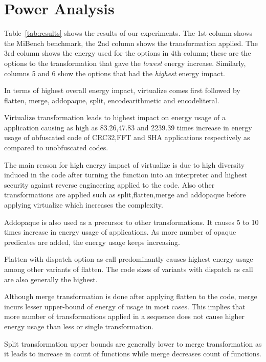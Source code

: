 \section{Power Analysis}
\label{sec:analysis}


%

Table~\ref{tab:results} shows the results of our experiments. The 1st column shows the MiBench benchmark, the 2nd column shows the transformation applied. The 3rd column shows the energy used for the options in 4th column; these are the options to the transformation that gave the {\em lowest} energy increase. Similarly, columns 5 and 6 show the options that had the {\em highest} energy impact.

In terms of highest overall energy impact, virtualize comes first followed by flatten, merge, addopaque, split, encodearithmetic and encodeliteral.

Virtualize transformation leads to highest impact on energy usage of a application causing as high as 83.26,47.83 and 2239.39 times increase in energy usage of obfuscated code of CRC32,FFT and SHA applications respectively as compared to unobfuscated codes.

The main reason for high energy impact of virtualize is due to high diversity induced in the code after turning the function into an interpreter and highest security against reverse engineering applied to the code. Also other transformations are applied such as split,flatten,merge and addopaque before applying virtualize which increases the complexity. 

Addopaque is also used as a precursor to other transformations. It causes 5 to 10 times increase in energy usage of applications. As more number of opaque predicates are added, the energy usage keeps increasing.

Flatten with dispatch option as call predominantly causes highest energy usage among other variants of flatten. The code sizes of variants with dispatch as call are also generally the highest.

Although merge transformation is done after applying flatten to the code, merge incurs lesser upper-bound of energy of usage in most cases. This implies that more number of transformations applied in a sequence does not cause higher energy usage than less or single transformation.

Split transformation upper bounds are generally lower to merge transformation as it leads to increase in count of functions while merge decreases count of functions.

